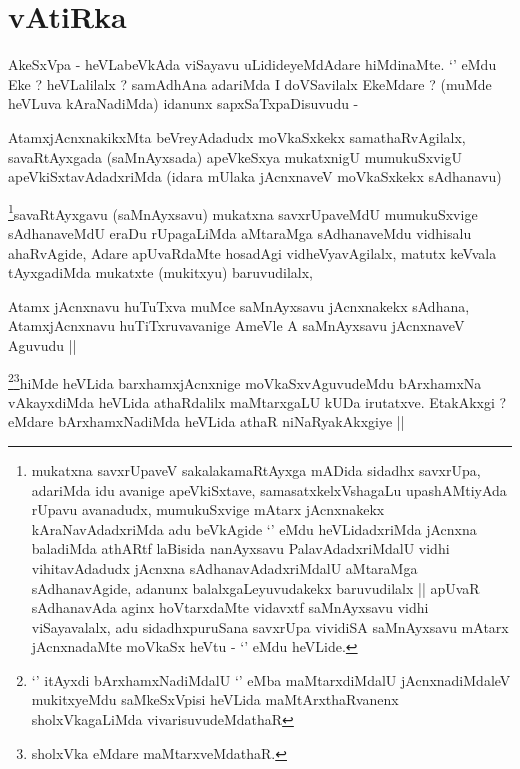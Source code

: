 \section*{vAtiRka}


\begin{artha}
AkeSxVpa - heVLabeVkAda viSayavu uLidideyeMdAdare hiMdinaMte. `\stext'
eMdu Eke ? heVLalilalx ? samAdhAna adariMda I doVSavilalx EkeMdare ?
(muMde heVLuva kAraNadiMda) idanunx sapxSaTxpaDisuvudu -
\end{artha}

\begin{artha}
AtamxjAcnxnakikxMta beVreyAdadudx moVkaSxkekx samathaRvAgilalx,
savaRtAyxgada (saMnAyxsada) apeVkeSxya mukatxnigU mumukuSxvigU
apeVkiSxtavAdadxriMda (idara mUlaka jAcnxnaveV moVkaSxkekx sAdhanavu)
\end{artha}


\begin{artha}
\footnote{mukatxna savxrUpaveV sakalakamaRtAyxga mADida sidadhx
  savxrUpa, adariMda idu avanige apeVkiSxtave, samasatxkelxVshagaLu
  upashAMtiyAda rUpavu avanadudx, mumukuSxvige mAtarx jAcnxnakekx
  kAraNavAdadxriMda adu beVkAgide `\stext' eMdu heVLidadxriMda jAcnxna
  baladiMda athARtf laBisida nanAyxsavu PalavAdadxriMdalU vidhi
  vihitavAdadudx jAcnxna sAdhanavAdadxriMdalU aMtaraMga sAdhanavAgide,
  adanunx balalxgaLeyuvudakekx baruvudilalx || apUvaR sAdhanavAda
  aginx hoVtarxdaMte vidavxtf saMnAyxsavu vidhi viSayavalalx, adu
  sidadhxpuruSana savxrUpa vividiSA saMnAyxsavu mAtarx jAcnxnadaMte
  moVkaSx heVtu - `\stext' eMdu heVLide.}savaRtAyxgavu (saMnAyxsavu) mukatxna savxrUpaveMdU
mumukuSxvige sAdhanaveMdU eraDu rUpagaLiMda aMtaraMga sAdhanaveMdu
vidhisalu ahaRvAgide, Adare apUvaRdaMte hosadAgi vidheVyavAgilalx,
matutx keVvala tAyxgadiMda mukatxte (mukitxyu) baruvudilalx, 
\end{artha}

\begin{artha}
Atamx jAcnxnavu huTuTxva muMce saMnAyxsavu jAcnxnakekx sAdhana,
AtamxjAcnxnavu huTiTxruvavanige AmeVle A saMnAyxsavu jAcnxnaveV
Aguvudu ||
\end{artha}

\begin{artha}
\footnote{`\stext' itAyxdi bArxhamxNadiMdalU `\stext' eMba
  maMtarxdiMdalU jAcnxnadiMdaleV mukitxyeMdu saMkeSxVpisi heVLida
  maMtArxthaRvanenx sholxVkagaLiMda
  vivarisuvudeMdathaR}\footnote{sholxVka eMdare maMtarxveMdathaR.}hiMde heVLida barxhamxjAcnxnige moVkaSxvAguvudeMdu
bArxhamxNa vAkayxdiMda heVLida athaRdalilx maMtarxgaLU kUDa
irutatxve. EtakAkxgi ? eMdare bArxhamxNadiMda heVLida athaR
niNaRyakAkxgiye ||
\end{artha}

